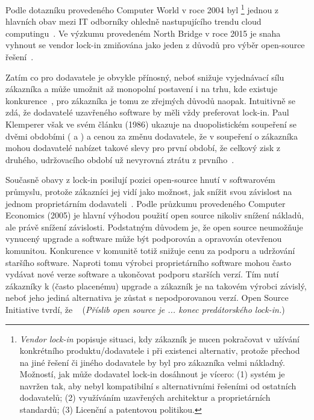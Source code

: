 \begin{multicols}{2}
	Podle dotazníku provedeného Computer World v roce 2004 byl \footnote{{\em Vendor lock-in} popisuje situaci, kdy zákazník je nucen pokračovat v užívání konkrétního produktu/dodavatele i při existenci alternativ, protože přechod na jiné řešení či jiného dodavatele by byl pro zákazníka velmi nákladný. Možností, jak může dodavatel lock-in dosáhnout je vícero: (1) systém je navržen tak, aby nebyl kompatibilní s alternativními řešeními od ostatních dodavatelů; (2) využíváním uzavřených architektur a proprietárních standardů; (3) Licenční a patentovou politikou.} jednou z hlavních obav mezi IT odborníky ohledně nastupujícího trendu cloud computingu~\cite{computer-world-2004}. Ve výzkumu provedeném North Bridge v roce 2015 je snaha vyhnout se vendor lock-in zmiňována jako jeden z důvodů pro výběr open-source řešení~\cite{survey-2015}.

	Zatím co pro dodavatele je  obvykle přínosný, neboť snižuje
	vyjednávací sílu zákazníka a může umožnit až monopolní postavení i na trhu,
	kde existuje konkurence~\cite[str. 1]{lock-in-competition}, pro zákazníka
	je tomu ze zřejmých důvodů naopak. Intuitivně se zdá, že dodavatelé
	uzavřeného software by měli vždy preferovat lock-in. Paul Klemperer však ve
	svém článku (1986) ukazuje na duopolistickém soupeření se dvěmi obdobími
	( a ) a cenou za změnu dodavatele, že v soupeření o zákazníka mohou dodavatelé nabízet takové slevy pro první období, že celkový zisk z druhého, udržovacího období už nevyrovná ztrátu z prvního~\cite{klemperer-switching-costs,lock-in-competition}.

	Současně obavy z lock-in posilují pozici open-source hnutí v softwarovém průmyslu, protože zákazníci jej vidí jako možnost, jak snížit svou závislost na jednom proprietárním dodavateli~\cite{opensource-advantage}. Podle průzkumu provedeného Computer Economics (2005) je hlavní výhodou použití open source nikoliv snížení nákladů, ale právě snížení závislosti. Podstatným důvodem je, že open source neumožňuje vynucený upgrade a software může být podporován a opravován otevřenou komunitou. Konkurence v komunitě totiž snižuje cenu za podporu a udržování staršího software. Naproti tomu výrobci proprietárního software mohou často vydávat nové verze software a ukončovat podporu starších verzí. Tím nutí zákazníky k (často placenému) upgrade a zákazník je na takovém výrobci závislý, neboť jeho jediná alternativa je zůstat s nepodporovanou verzí. Open Source Initiative tvrdí, že ~\cite{OSI} ({\em Příslib open source je ... konec predátorského lock-in.})


\end{multicols}
